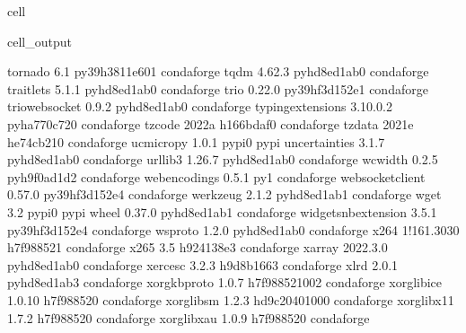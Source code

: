 \documentclass[letterpaper,table,10pt,english]{jupyterBook}
\begin{document}
\begin{sphinxuseclass}{cell}
\begin{sphinxVerbatimOutput}
\begin{sphinxuseclass}{cell_output}
\begin{sphinxVerbatim}[commandchars=\\\{\}]
tornado                   6.1              py39h3811e60\PYGZus{}1    conda\PYGZhy{}forge
tqdm                      4.62.3             pyhd8ed1ab\PYGZus{}0    conda\PYGZhy{}forge
traitlets                 5.1.1              pyhd8ed1ab\PYGZus{}0    conda\PYGZhy{}forge
trio                      0.22.0           py39hf3d152e\PYGZus{}1    conda\PYGZhy{}forge
trio\PYGZhy{}websocket            0.9.2              pyhd8ed1ab\PYGZus{}0    conda\PYGZhy{}forge
typing\PYGZus{}extensions         3.10.0.2           pyha770c72\PYGZus{}0    conda\PYGZhy{}forge
tzcode                    2022a                h166bdaf\PYGZus{}0    conda\PYGZhy{}forge
tzdata                    2021e                he74cb21\PYGZus{}0    conda\PYGZhy{}forge
uc\PYGZhy{}micro\PYGZhy{}py               1.0.1                    pypi\PYGZus{}0    pypi
uncertainties             3.1.7              pyhd8ed1ab\PYGZus{}0    conda\PYGZhy{}forge
urllib3                   1.26.7             pyhd8ed1ab\PYGZus{}0    conda\PYGZhy{}forge
wcwidth                   0.2.5              pyh9f0ad1d\PYGZus{}2    conda\PYGZhy{}forge
webencodings              0.5.1                      py\PYGZus{}1    conda\PYGZhy{}forge
websocket\PYGZhy{}client          0.57.0           py39hf3d152e\PYGZus{}4    conda\PYGZhy{}forge
werkzeug                  2.1.2              pyhd8ed1ab\PYGZus{}1    conda\PYGZhy{}forge
wget                      3.2                      pypi\PYGZus{}0    pypi
wheel                     0.37.0             pyhd8ed1ab\PYGZus{}1    conda\PYGZhy{}forge
widgetsnbextension        3.5.1            py39hf3d152e\PYGZus{}4    conda\PYGZhy{}forge
wsproto                   1.2.0              pyhd8ed1ab\PYGZus{}0    conda\PYGZhy{}forge
x264                      1!161.3030           h7f98852\PYGZus{}1    conda\PYGZhy{}forge
x265                      3.5                  h924138e\PYGZus{}3    conda\PYGZhy{}forge
xarray                    2022.3.0           pyhd8ed1ab\PYGZus{}0    conda\PYGZhy{}forge
xerces\PYGZhy{}c                  3.2.3                h9d8b166\PYGZus{}3    conda\PYGZhy{}forge
xlrd                      2.0.1              pyhd8ed1ab\PYGZus{}3    conda\PYGZhy{}forge
xorg\PYGZhy{}kbproto              1.0.7             h7f98852\PYGZus{}1002    conda\PYGZhy{}forge
xorg\PYGZhy{}libice               1.0.10               h7f98852\PYGZus{}0    conda\PYGZhy{}forge
xorg\PYGZhy{}libsm                1.2.3             hd9c2040\PYGZus{}1000    conda\PYGZhy{}forge
xorg\PYGZhy{}libx11               1.7.2                h7f98852\PYGZus{}0    conda\PYGZhy{}forge
xorg\PYGZhy{}libxau               1.0.9                h7f98852\PYGZus{}0    conda\PYGZhy{}forge

\end{sphinxVerbatim}
\end{sphinxuseclass}
\end{sphinxVerbatimOutput}
\end{sphinxuseclass}
\end{document}
